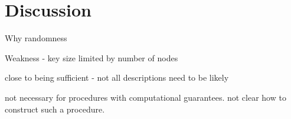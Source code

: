 \section{Discussion}
Why randomness

Weakness - key size limited by number of nodes

close to being sufficient - not all descriptions need to be likely

not necessary for procedures with computational guarantees. not clear how to construct such a procedure.
